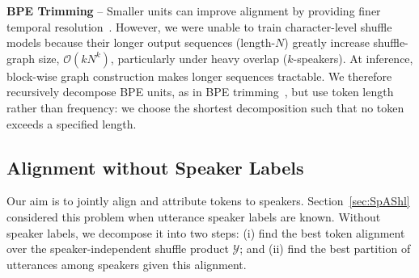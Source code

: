 \textbf{BPE Trimming} -- Smaller units can improve alignment by providing finer temporal resolution~\cite{bain2023whisperx}. However, we were unable to train character-level shuffle models because their longer output sequences (length-$N$) greatly increase shuffle-graph size, $\mathcal{O}\left(kN^k\right)$, particularly under heavy overlap ($k$-speakers). At inference, block-wise graph construction makes longer sequences tractable. We therefore recursively decompose BPE units, as in BPE trimming~\cite{sennrich2019revisiting,cognetta-etal-2024-analysis}, but use token length rather than frequency: we choose the shortest decomposition such that no token exceeds a specified length.


\vspace{-5mm}
\subsection{Alignment without Speaker Labels}
\label{sec:speaker_attribution}
Our aim is to jointly align and attribute tokens to speakers. Section~\ref{sec:SpAShl} considered this problem when utterance speaker labels are known. Without speaker labels, we decompose it into two steps: (i) find the best token alignment over the speaker-independent shuffle product $\mathcal{Y}$; and (ii) find the best partition of utterances among speakers given this alignment.



